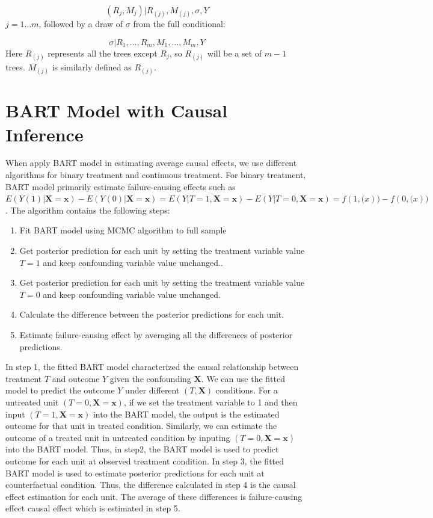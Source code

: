 \begin{equation*}
(R_j,M_j)|R_{(j)}, M_{(j)}, \sigma, Y
\end{equation*}
$j=1 \ldots m$, followed by a draw of $\sigma$ from the full conditional: 

\begin{equation*}
\sigma |{R_1}, \ldots ,{R_m},{M_1}, \ldots ,{M_m},Y
\end{equation*}
Here $R_{(j)}$ represents all the trees except $R_j$, so $R_{(j)}$ will be a set of $m-1$ trees. $M_{(j)}$ is similarly defined as $R_{(j)}$. 

\section{BART Model with Causal Inference}\label{BARTafce}%

When apply BART model in estimating average causal effects, we use different algorithms for binary treatment and continuous treatment. For binary treatment, BART model primarily estimate failure-causing effects such as $E(Y(1)|\pmb{X}=\pmb{x}) - E(Y(0)|\pmb{X}=\pmb{x})=E(Y|T=1, \pmb{X}=\pmb{x})-E(Y|T=0, \pmb{X}=\pmb{x})=f(1,\pmb(x))-f(0,\pmb(x))$ . The algorithm contains the following steps:
\begin{enumerate}
\item Fit BART model using MCMC algorithm to full sample
\item Get posterior prediction for each unit by setting the treatment variable value $T=1$ and keep confounding variable value unchanged..
\item Get posterior prediction for each unit by setting the treatment variable value $T=0$ and keep confounding variable value unchanged.
\item	Calculate the difference between the posterior predictions for each unit.
\item Estimate failure-causing effect by averaging all the differences of posterior predictions. 
\end{enumerate}

In step 1, the fitted BART model characterized the causal relationship between treatment $T$ and outcome $Y$ given the confounding $\pmb{X}$. We can use the fitted model to predict the outcome $Y$ under different $(T, \pmb{X})$ conditions. For a untreated unit $(T=0, \pmb{X}=\pmb{x})$,  if we set the treatment variable to 1 and then input $(T=1, \pmb{X}=\pmb{x})$ into the BART model, the output is the estimated outcome for that unit in treated condition. Similarly, we can estimate the outcome of a treated unit in untreated condition by inputing $(T=0, \pmb{X}=\pmb{x})$ into the BART model. Thus, in step2, the BART model is used to predict outcome for each unit at observed treatment condition. In step 3, the fitted BART model is used to estimate posterior predictions for each unit at counterfactual condition. Thus, the difference calculated in step 4 is the causal effect estimation for each unit. The average of these differences is failure-causing effect causal effect which is estimated in step 5.

